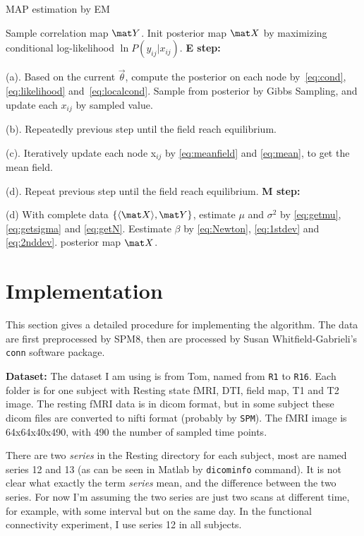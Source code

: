 \documentclass[12pt]{article}
\begin{document}
  \begin{algorithm}[tbh]
    \caption{MAP estimation by EM}
    \label{alg:1}
    \begin{algorithmic}
      \REQUIRE Sample correlation map $\mat Y$.
      \STATE Init posterior map $\mat X$  by maximizing conditional log-likelihood $\ln P(y_{ij}|x_{ij})$.  
      \STATE \textbf{E step: }

      (a). Based on the current $\vec \theta$, compute the posterior on each node by~\eqref{eq:cond}, \eqref{eq:likelihood} and~\eqref{eq:localcond}. Sample from posterior by Gibbs Sampling, and update each $x_{ij}$ by sampled value.

      (b). Repeatedly previous step until the field reach equilibrium.

      (c). Iteratively update each node x$_{ij}$ by \eqref{eq:meanfield} and \eqref{eq:mean}, to get the mean field. 

      (d). Repeat previous step until the field reach equilibrium.
      \STATE \textbf{M step: } 

      (d) With complete data $\{\langle \mat X \rangle, \mat
      Y\}$, estimate $\mu$ and $\sigma^2$ by \eqref{eq:getmu}, \eqref{eq:getsigma} and \eqref{eq:getN}. Eestimate $\beta$ by \eqref{eq:Newton}, \eqref{eq:1stdev} and \eqref{eq:2nddev}. 
      \ENDWHILE
      \RETURN posterior map $\mat X$.
    \end{algorithmic}
  \end{algorithm}

\section{Implementation}
This section gives a detailed procedure for implementing the algorithm. The data are first preprocessed by SPM8, then are processed by Susan Whitfield-Gabrieli's  \texttt{conn} software package.

\textbf{Dataset:} The dataset I am using is from Tom, named from \texttt{R1} to \texttt{R16}. Each folder is for one subject with Resting state fMRI, DTI, field map, T1 and T2 image. The resting fMRI data is in dicom format, but in some subject these dicom files are converted to nifti format (probably by \texttt{SPM}). The fMRI image is 64x64x40x490, with 490 the number of sampled time points. 

There are two \emph{series} in the Resting directory for each subject, most are named series 12 and 13 (as can be seen in Matlab by \texttt{dicominfo} command). It is not clear what exactly the term \emph{series} mean, and the difference between the two series.  For now I'm assuming the two series are just two scans at different time, for example, with some interval but on the same day. In the functional connectivity experiment, I use series 12 in all subjects. 
\end{document}
